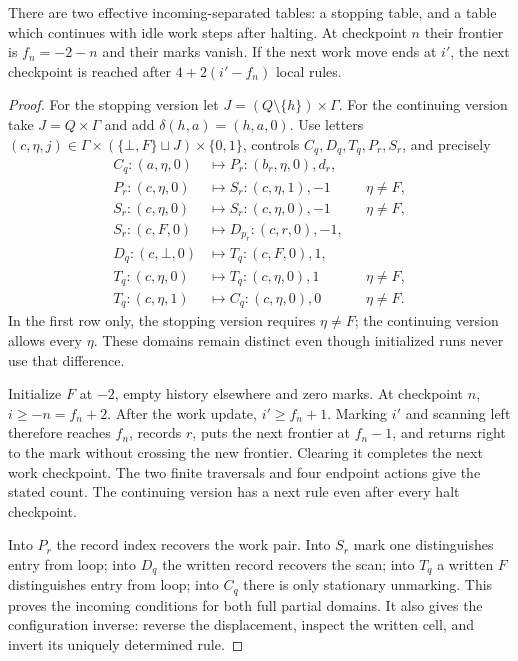\begin{lemma}\label{lem:bb-mid-left-compiler}
There are two effective incoming-separated tables: a stopping table,
and a table which continues with idle work steps after halting.
At checkpoint $n$ their frontier is $f_n=-2-n$ and their marks vanish.
If the next work move ends at $i'$, the next checkpoint is reached
after $4+2(i'-f_n)$ local rules.
\end{lemma}
\begin{proof}
For the stopping version let $J=(Q\setminus\{h\})\times\Gamma$.
For the continuing version take $J=Q\times\Gamma$ and add
$\delta(h,a)=(h,a,0)$.  Use letters
$(c,\eta,j)\in\Gamma\times(\{\bot,F\}\sqcup J)\times\{0,1\}$,
controls $C_q,D_q,T_q,P_r,S_r$, and precisely
\begin{equation}\label{eq:bb-mid-left-table}
\begin{aligned}
 C_q:(a,\eta,0)&\mapsto P_r:(b_r,\eta,0),d_r,\\
 P_r:(c,\eta,0)&\mapsto S_r:(c,\eta,1),-1&&\eta\ne F,\\
 S_r:(c,\eta,0)&\mapsto S_r:(c,\eta,0),-1&&\eta\ne F,\\
 S_r:(c,F,0)&\mapsto D_{p_r}:(c,r,0),-1,\\
 D_q:(c,\bot,0)&\mapsto T_q:(c,F,0),1,\\
 T_q:(c,\eta,0)&\mapsto T_q:(c,\eta,0),1&&\eta\ne F,\\
 T_q:(c,\eta,1)&\mapsto C_q:(c,\eta,0),0&&\eta\ne F.
\end{aligned}
\end{equation}
In the first row only, the stopping version requires $\eta\ne F$;
the continuing version allows every $\eta$.  These domains remain
distinct even though initialized runs never use that difference.

Initialize $F$ at $-2$, empty history elsewhere and zero marks.
At checkpoint $n$, $i\ge-n=f_n+2$.  After the work update,
$i'\ge f_n+1$.  Marking $i'$ and scanning left therefore reaches
$f_n$, records $r$, puts the next frontier at $f_n-1$, and returns
right to the mark without crossing the new frontier.  Clearing it
completes the next work checkpoint.  The two finite traversals and
four endpoint actions give the stated count.  The continuing version
has a next rule even after every halt checkpoint.

Into $P_r$ the record index recovers the work pair.  Into $S_r$
mark one distinguishes entry from loop; into $D_q$ the written record
recovers the scan; into $T_q$ a written $F$ distinguishes entry from
loop; into $C_q$ there is only stationary unmarking.  This proves the
incoming conditions for both full partial domains.  It also gives
the configuration inverse: reverse the displacement, inspect the
written cell, and invert its uniquely determined rule.
\end{proof}

